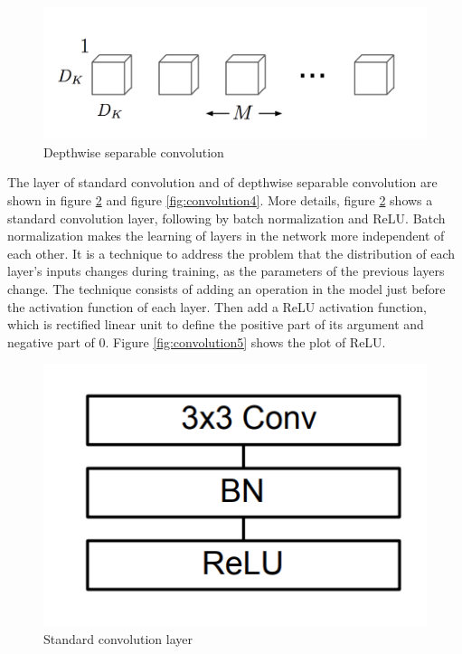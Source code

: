 \documentclass[11pt, titlepage]{article} %
\begin{document}
\begin{figure}[]
	\centering
   	\includegraphics[scale=0.5]{convolution2.png}
   	\caption{Depthwise separable convolution}
   	\label{fig:convolution2}
\end{figure}
The layer of standard convolution and of depthwise separable convolution are shown in figure \ref{fig:convolution3} and figure \ref{fig:convolution4}. More details, figure \ref{fig:convolution3} shows a standard convolution layer, following by batch normalization and ReLU. Batch normalization makes the learning of layers in the network more independent of each other. It is a technique to address the problem that the distribution of each layer’s inputs changes during training, as the parameters of the previous layers change. The technique consists of adding an operation in the model just before the activation function of each layer. Then add a ReLU activation function, which is rectified linear unit to define the positive part of its argument and negative part of 0. Figure \ref{fig:convolution5}  shows the plot of ReLU.

\begin{figure}[]
	\centering
   	\includegraphics[scale=0.5]{convolution3.png}
   	\caption{Standard convolution layer}
   	\label{fig:convolution3}
\end{figure}
\end{document}

